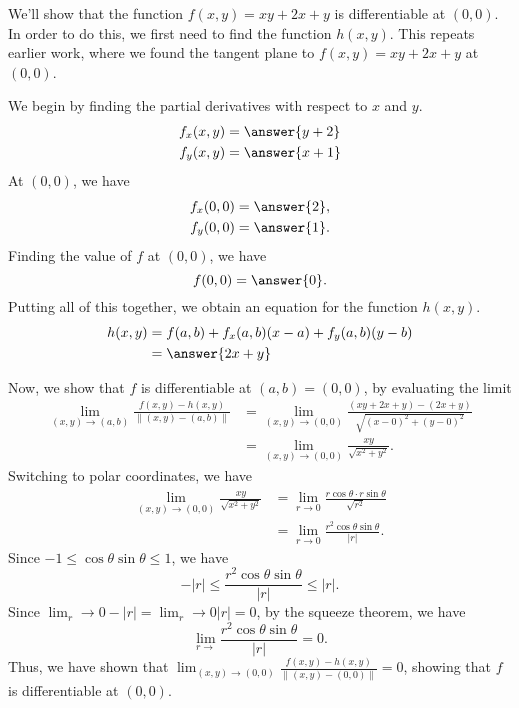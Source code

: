 \documentclass{ximera}
\begin{document}
\begin{example}
We'll show that the function $f(x,y) = xy+2x+y$ is differentiable at $(0,0)$. In order to do this, we first need to find the function $h(x,y)$. This repeats earlier work, where we found the tangent plane to $f(x,y) = xy+2x+y$ at $(0,0)$.

We begin by finding the partial derivatives with respect to $x$ and $y$.
\begin{align*}
f_x(x,y) &= \answer{y+2}\\
f_y(x,y) &= \answer{x+1}
\end{align*} 
At $(0,0)$, we have
\begin{align*}
f_x(0,0) &= \answer{2},\\
f_y(0,0) &= \answer{1}.
\end{align*} 
Finding the value of $f$ at $(0,0)$, we have
\[
f(0,0) = \answer{0}.
\]
Putting all of this together, we obtain an equation for the function $h(x,y)$.
\begin{align*}
h(x,y) &=f(a,b)+f_x(a,b)(x-a)+f_y(a,b)(y-b)\\
&= \answer{2x+y}
\end{align*}

Now, we show that $f$ is differentiable at $(a,b)=(0,0)$, by evaluating the limit
\begin{align*}
\lim_{(x,y)\rightarrow (a,b)}\frac{f(x,y) - h(x,y)}{\|(x,y)-(a,b)\|}  &= \lim_{(x,y)\rightarrow (0,0)}\frac{(xy+2x+y) - (2x+y)}{\sqrt{(x-0)^2+(y-0)^2}}\\
&= \lim_{(x,y)\rightarrow (0,0)}\frac{xy}{\sqrt{x^2+y^2}}.
\end{align*}
Switching to polar coordinates, we have
\begin{align*}
\lim_{(x,y)\rightarrow (0,0)}\frac{xy}{\sqrt{x^2+y^2}} &= \lim_{r\rightarrow 0}\frac{r\cos\theta\cdot r\sin\theta}{\sqrt{r^2}}\\
&=  \lim_{r\rightarrow 0}\frac{r^2\cos\theta\sin\theta}{|r|}.
\end{align*}
Since $-1\leq \cos\theta\sin\theta \leq 1$, we have
\[
-|r|\leq \frac{r^2\cos\theta\sin\theta}{|r|} \leq |r|.
\]
Since $\lim_r\rightarrow 0 -|r| = \lim_r\rightarrow 0 |r| = 0$, by the squeeze theorem, we have
\[
\lim_{r\rightarrow}\frac{r^2\cos\theta\sin\theta}{|r|} = 0.
\]
Thus, we have shown that $\lim_{(x,y)\rightarrow (0,0)}\frac{f(x,y) - h(x,y)}{\|(x,y)-(0,0)\|}=0$, showing that $f$ is differentiable at $(0,0)$. 
\end{example}
\end{document}
